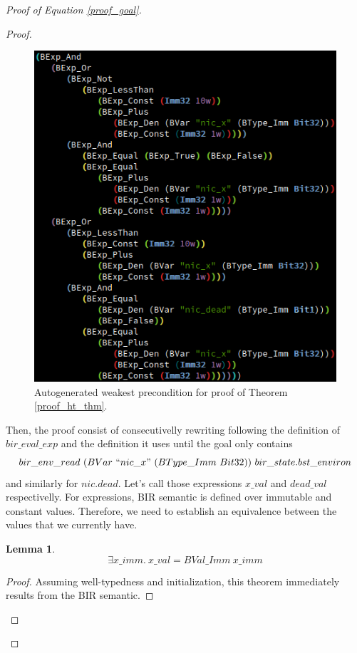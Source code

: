 \documentclass{kththesis}
\newtheorem{lemma}[theorem]{Lemma}
\begin{document}
\begin{proof}[Proof of Equation \ref{proof_goal}]
\begin{proof}
\begin{figure}[!h]
	\includegraphics[scale=.65]{figures/proof_wp_exp.png}
	\centering
	\caption{Autogenerated weakest precondition for proof of Theorem \ref{proof_ht_thm}.}
	\label{proof_wp_exp}
\end{figure}

Then, the proof consist of consecutivelly rewriting following the definition of $bir\_eval\_exp$ and the definition it uses until the goal only contains $$bir\_env\_read~(BVar~``nic\_x"~(BType\_Imm~Bit32))~bir\_state.bst\_environ$$ and similarly for $nic.dead$. Let's call those expressions $x\_val$ and $dead\_val$ respectivelly. For expressions, BIR semantic is defined over immutable and constant values. Therefore, we need to establish an equivalence between the values that we currently have.

\begin{lemma}
	\begin{equation*}
		\exists x\_imm.~x\_val = BVal\_Imm~x\_imm
	\end{equation*}
	\label{proof_exists_x_imm}
\end{lemma}
\begin{proof}
Assuming well-typedness and initialization, this theorem immediately results from the BIR semantic.
\end{proof}


\end{proof}
\end{proof}
\end{document}

